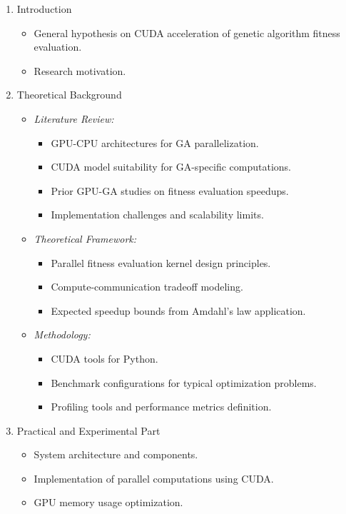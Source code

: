 \documentclass[12pt]{article}
\begin{document}
\small
\begin{enumerate}[label=\arabic*., leftmargin=*, itemsep=0.1cm]
\item {Introduction}
\begin{itemize}[noitemsep, topsep=0pt]
    \item General hypothesis on CUDA acceleration of genetic algorithm fitness evaluation.
    \item Research motivation.
\end{itemize}

\item {Theoretical Background}
\begin{itemize}[noitemsep, topsep=0pt]
    \item \textit{Literature Review:}
    \begin{itemize}[noitemsep]
        \item GPU-CPU architectures for GA parallelization.
        \item CUDA model suitability for GA-specific computations.
        \item Prior GPU-GA studies on fitness evaluation speedups.
        \item Implementation challenges and scalability limits.
    \end{itemize}
    \item \textit{Theoretical Framework:}
    \begin{itemize}[noitemsep]
        \item Parallel fitness evaluation kernel design principles.
        \item Compute-communication tradeoff modeling.
        \item Expected speedup bounds from Amdahl's law application.
    \end{itemize}
    \item \textit{Methodology:}
    \begin{itemize}[noitemsep]
        \item CUDA tools for Python.
        \item Benchmark configurations for typical optimization problems.
        \item Profiling tools and performance metrics definition.
    \end{itemize}
\end{itemize}

\item {Practical and Experimental Part}
\begin{itemize}[noitemsep, topsep=0pt]
    \item System architecture and components.
    \item Implementation of parallel computations using CUDA.
    \item GPU memory usage optimization.
\end{itemize}


\end{enumerate}
\end{document}
